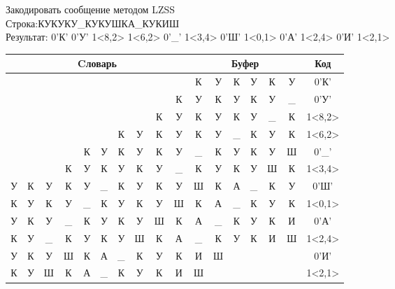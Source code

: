 \documentclass[a4paper, 12pt]{article}
\begin{document}
Закодировать сообщение методом LZSS\\
Строка:КУКУКУ\_КУКУШКА\_КУКИШ\\
Результат: 0'К' 0'У' 1<8,2> 1<6,2> 0'\_' 1<3,4> 0'Ш' 1<0,1> 0'А' 1<2,4> 0'И' 1<2,1>\\
\begin{table}[h!]
\centering
\begin{tabular}{|c|c|c|c|c|c|c|c|c|c|c|c|c|c|c|c|c|}
\hline
\multicolumn{10}{|c|}{Cловарь} & \multicolumn{6}{c|}{Буфер} & Код  \\ \hline
  &   &   &   &   &   &   &   &   &   & К & У & К & У & К & У & 0'К'\\ \hline
  &   &   &   &   &   &   &   &   & К & У & К & У & К & У & \_ & 0'У'\\ \hline
  &   &   &   &   &   &   &   & \cellcolor[HTML]{FFFF00} К & \cellcolor[HTML]{FFFF00} У & \cellcolor[HTML]{FFFF00} К & \cellcolor[HTML]{FFFF00} У & К & У & \_ & К & 1<8,2>\\ \hline
  &   &   &   &   &   & \cellcolor[HTML]{FFFF00} К & \cellcolor[HTML]{FFFF00} У & К & У & \cellcolor[HTML]{FFFF00} К & \cellcolor[HTML]{FFFF00} У & \_ & К & У & К & 1<6,2>\\ \hline
  &   &   &   & К & У & К & У & К & У & \_ & К & У & К & У & Ш & 0'\_'\\ \hline
  &   &   & \cellcolor[HTML]{FFFF00} К & \cellcolor[HTML]{FFFF00} У & \cellcolor[HTML]{FFFF00} К & \cellcolor[HTML]{FFFF00} У & К & У & \_ & \cellcolor[HTML]{FFFF00} К & \cellcolor[HTML]{FFFF00} У & \cellcolor[HTML]{FFFF00} К & \cellcolor[HTML]{FFFF00} У & Ш & К & 1<3,4>\\ \hline
У & К & У & К & У & \_ & К & У & К & У & Ш & К & А & \_ & К & У & 0'Ш'\\ \hline
\cellcolor[HTML]{FFFF00} К & У & К & У & \_ & К & У & К & У & Ш & \cellcolor[HTML]{FFFF00} К & А & \_ & К & У & К & 1<0,1>\\ \hline
У & К & У & \_ & К & У & К & У & Ш & К & А & \_ & К & У & К & И & 0'А'\\ \hline
К & У & \cellcolor[HTML]{FFFF00} \_ & \cellcolor[HTML]{FFFF00} К & \cellcolor[HTML]{FFFF00} У & \cellcolor[HTML]{FFFF00} К & У & Ш & К & А & \cellcolor[HTML]{FFFF00} \_ & \cellcolor[HTML]{FFFF00} К & \cellcolor[HTML]{FFFF00} У & \cellcolor[HTML]{FFFF00} К & И & Ш & 1<2,4>\\ \hline
У & К & У & Ш & К & А & \_ & К & У & К & И & Ш &   &   &   &   & 0'И'\\ \hline
К & У & \cellcolor[HTML]{FFFF00} Ш & К & А & \_ & К & У & К & И & \cellcolor[HTML]{FFFF00} Ш &   &   &   &   &   & 1<2,1>\\ \hline
\end{tabular}
\end{table}
\end{document}
